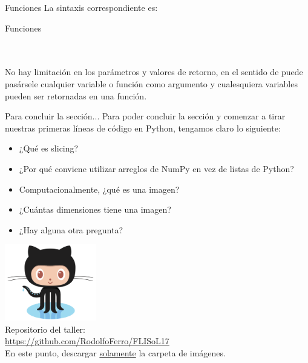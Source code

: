 \documentclass[usenames,dvipsnames]{beamer}
\begin{document}
  \begin{frame}{Funciones}
    La sintaxis correspondiente es:
    \begin{block}{Funciones}
      \\
      \\
      \\
      \vspace*{0.5cm}
    \end{block}
    \vspace*{0.5cm}

    No hay limitación en los parámetros y valores de retorno, en el sentido de
    puede pasársele cualquier variable o función como argumento y cualesquiera
    variables pueden ser retornadas en una función.
  \end{frame}

  \begin{frame}{Para concluir la sección...}
    Para poder concluir la sección y comenzar a tirar nuestras primeras
    líneas de código en Python, tengamos claro lo siguiente:
    \begin{itemize}
      \item ¿Qué es slicing?
      \item ¿Por qué conviene utilizar arreglos de NumPy en vez de listas
      de Python?
      \item Computacionalmente, ¿qué es una imagen?
      \item ¿Cuántas dimensiones tiene una imagen?
      \item ¿Hay alguna otra pregunta?
    \end{itemize}
  \end{frame}

  \begin{frame}[standout]
    \includegraphics[width=0.3\textwidth]{imgs/Octocat}\\
    Repositorio del taller:\\
    {\color{orange} \url{https://github.com/RodolfoFerro/FLISoL17}}\\
    \vspace*{0.5cm}
    En este punto, descargar \underline{solamente} la carpeta de imágenes.
  \end{frame}
\end{document}
